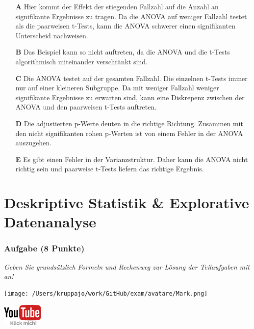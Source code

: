 \documentclass[a4paper, 9pt]{scrartcl}\usepackage[]{graphicx}\usepackage[]{xcolor}
\begin{document}
\begin{enumerate}
\item [\textbf{A} \msquare] Hier kommt der Effekt der stiegenden Fallzahl auf die Anzahl an signifikante Ergebnisse zu tragen. Da die ANOVA auf weniger Fallzahl testet als die paarweisen t-Tests, kann die ANOVA schwerer einen signifikanten Unterscheid nachweisen.
\item [\textbf{B} \msquare] Das Beispiel kann so nicht auftreten, da die ANOVA und die t-Tests algorithmisch miteinander verschränkt sind.
\item [\textbf{C} \msquare] Die ANOVA testet auf der gesamten Fallzahl. Die einzelnen t-Tests immer nur auf einer kleineren Subgruppe. Da mit weniger Fallzahl weniger signifikante Ergebnisse zu erwarten sind, kann eine Diskrepenz zwischen der ANOVA und den paarweisen t-Tests auftreten.
\item [\textbf{D} \msquare] Die adjustierten p-Werte deuten in die richtige Richtung. Zusammen mit den nicht signifikanten rohen p-Werten ist von einem Fehler in der ANOVA auszugehen.
\item [\textbf{E} \msquare] Es gibt einen Fehler in der Varianzstruktur. Daher kann die ANOVA nicht richtig sein und paarweise t-Tests liefern das richtige Ergebnis.
\end{enumerate}
    
\clearpage
\part{Deskriptive Statistik \& Explorative Datenanalyse}

\section{Aufgabe \hfill (8 Punkte)}

\textit{Geben Sie grundsätzlich Formeln und Rechenweg zur Lösung der Teilaufgaben mit an!} \\[1Ex]
 

 
\begin{minipage}[t]{0.5\textwidth}
\texttt{[image: /Users/kruppajo/work/GitHub/exam/avatare/Mark.png]}
\end{minipage}
\begin{minipage}[t]{0.5\textwidth}
\hfill
\href{https://youtu.be/t0WYa_LVc5o}{\includegraphics[width = 2cm]{img/youtube}}
\end{minipage}
\vspace{-3ex}
\end{document}
